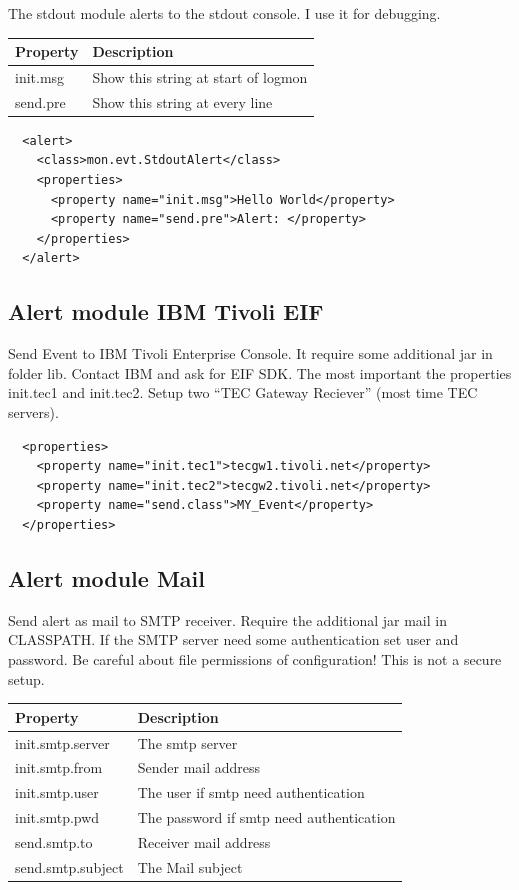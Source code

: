 \documentclass[11pt,a4paper]{article}
\begin{document}
The stdout module alerts to the stdout console. I use it for debugging.

\begin{tabular}{l|p{}}
  Property 	& Description\\\hline
  init.msg 	& Show this string at start of logmon\\
  send.pre 	& Show this string at every line\\
\end{tabular}

\begin{verbatim}
  <alert>
    <class>mon.evt.StdoutAlert</class>
    <properties>
      <property name="init.msg">Hello World</property>
      <property name="send.pre">Alert: </property>
    </properties>
  </alert>
\end{verbatim}

\subsection{Alert module IBM Tivoli EIF}
\label{sec:eif}

Send Event to IBM Tivoli Enterprise Console. It require some additional jar in
folder lib. Contact IBM and ask for EIF SDK. The most important the properties 
init.tec1 and init.tec2. Setup two ``TEC Gateway Reciever'' (most time TEC
servers).

\begin{verbatim}
  <properties>
    <property name="init.tec1">tecgw1.tivoli.net</property>
    <property name="init.tec2">tecgw2.tivoli.net</property>
    <property name="send.class">MY_Event</property>
  </properties>
\end{verbatim}

\subsection{Alert module Mail}

Send alert as mail to SMTP receiver. Require the additional jar mail in
CLASSPATH. If the SMTP server need some authentication set user and
password. Be careful about file permissions of 
configuration! This is not a secure setup. 

\begin{tabular}{l|p{}}
  Property 		    & Description\\\hline
  init.smtp.server 	& The smtp server\\
  init.smtp.from    & Sender mail address\\
  init.smtp.user 	& The user if smtp need authentication\\
  init.smtp.pwd 	& The password if smtp need authentication\\
  send.smtp.to 		& Receiver mail address\\
  send.smtp.subject & The Mail subject\\
\end{tabular}
\end{document}
